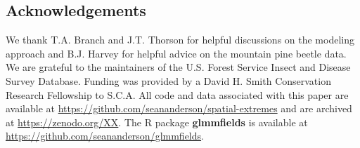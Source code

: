 \documentclass[12pt,english]{article}
\begin{document}
\begin{spacing}{1.9}

%
%

\section{Acknowledgements}

We thank T.A. Branch and J.T. Thorson for helpful discussions on the modeling
approach and B.J. Harvey for helpful advice on the mountain pine beetle data. We
are grateful to the maintainers of the U.S. Forest Service Insect and Disease
Survey Database. Funding was provided by a David H. Smith Conservation Research
Fellowship to S.C.A.
All code and data associated with this paper are available at
\url{https://github.com/seananderson/spatial-extremes} and are archived at
\url{https://zenodo.org/XX}.
The R package \textbf{glmmfields} is available at
\url{https://github.com/seananderson/glmmfields}.


\end{spacing}
\end{document}
